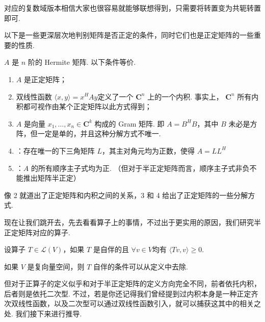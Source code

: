 对应的复数域版本相信大家也很容易就能够联想得到，只需要将转置变为共轭转置即可.

以下是一些更深层次地判别矩阵是否正定的条件，同时它们也是正定矩阵的一些重要的性质.

\begin{theorem}
    $ A $ 是 $ n $ 阶的 Hermite 矩阵. 以下条件等价.
    \begin{enumerate}
        \item $ A $ 是正定矩阵；

        \item 双线性函数 $ \langle x, y \rangle = x^{H}Ay $定义了一个 $ \mathbf{C}^n $ 上的一个内积. 事实上， $ \mathbf{C}^n $ 所有内积都可视作由某个正定矩阵以此方式得到；

        \item $ A $ 是向量 $ x_1, \ldots , x_n \in \mathbf{C}^k $ 构成的
              Gram 矩阵. 即 $ A = B^{H}B $，其中 $ B $ 未必是方阵，但一定是单的，并且这种分解方式不唯一.

        \item {}：存在唯一的下三角矩阵 $ L $，其主对角元均为正数，使得 $ A = LL^{H} $

        \item {}：$ A $ 的所有顺序主子式均为正. （但对于半正定矩阵而言，顺序主子式非负不能推出矩阵半正定）
    \end{enumerate}
\end{theorem}

像 2 就道出了正定矩阵和内积之间的关系，3 和 4 给出了正定矩阵的一些分解方式.

现在让我们跳开去，先去看看算子上的事情，不过出于更实用的原因，我们研究半正定矩阵对应的算子.

\begin{definition}[正算子] 
    设算子 $ T \in \mathcal{L}(V) $，如果 $ T $ 是自伴的且 $ \forall v \in V $均有 $ \langle Tv, v \rangle \geqslant 0 $.
\end{definition}

如果 $ V $ 是复向量空间，则 $ T $ 自伴的条件可以从定义中去除.

但对于正算子的定义似乎和对于半正定矩阵的定义方向完全不同，前者依托内积，后者则是依托二次型. 不过，若是你还记得我们曾经提到过内积本身是一种正定齐次双线性函数，以及二次型可以通过双线性函数引入，就可以捕获这其中的相关之处. 我们接下来进行推导.

